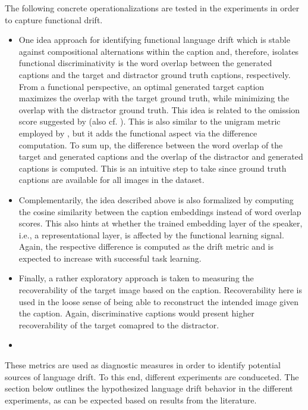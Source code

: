 The following concrete operationalizations are tested in the experiments in order to capture functional drift. \begin{itemize}
	\item One idea approach for identifying functional language drift which is stable against compositional alternations within the caption and, therefore, isolates functional discriminativity is the word overlap between the generated captions and the target and distractor ground truth captions, respectively. From a functional perspective, an optimal generated target caption maximizes the overlap with the target ground truth, while minimizing the overlap with the distractor ground truth. This idea is related to the omission score suggested by \cite{havrylov2017emergence} (also cf. \cite{andreas2016reasoning, gunel2020supervised}). This is also similar to the unigram metric employed by \cite{lazaridou2020multi}, but it adds the functional aspect via the difference computation. To sum up, the difference between the word overlap of the target and generated captions and the overlap of the distractor and generated captions is computed. This is an intuitive step to take since ground truth captions are available for all images in the dataset.
	\item Complementarily, the idea described above is also formalized by computing the cosine similarity between the caption embeddings instead of word overlap scores. This also hints at whether the trained embedding layer of the speaker, i.e., a representational layer, is affected by the functional learning signal. Again, the respective difference is computed as the drift metric and is expected to increase with successful task learning.
	\item Finally, a rather exploratory approach is taken to measuring the recoverability of the target image based on the caption. Recoverability here is used in the loose sense of being able to reconstruct the intended image given the caption. Again, discriminative captions would present higher recoverability of the target comapred to the distractor. 
	\item {}
\end{itemize}
These metrics are used as diagnostic measures in order to identify potential sources of language drift. To this end, different experiments are conduceted. The section below outlines the hypothesized language drift behavior in the different experiments, as can be expected based on results from the literature.

